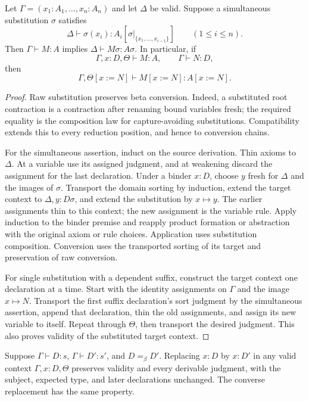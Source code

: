 \begin{lemma}\label{pts:substitution}
Let $\Gamma=(x_1:A_1,\ldots,x_n:A_n)$ and let $\Delta$ be valid.
Suppose a simultaneous substitution $\sigma$ satisfies
\[
 \Delta\vdash\sigma(x_i):A_i[\sigma|_{\{x_1,\ldots,x_{i-1}\}}]
 \qquad(1\leq i\leq n).
\]
Then $\Gamma\vdash M:A$ implies $\Delta\vdash M\sigma:A\sigma$.
In particular, if
\[
 \Gamma,x:D,\Theta\vdash M:A,
 \qquad \Gamma\vdash N:D,
\]
then
\[
 \Gamma,\Theta[x:=N]\vdash M[x:=N]:A[x:=N].
\]
\end{lemma}

\begin{proof}
Raw substitution preserves beta conversion. Indeed, a substituted root
contraction is a contraction after renaming bound variables fresh;
the required equality is the composition law for capture-avoiding
substitutions. Compatibility extends this to every reduction position,
and hence to conversion chains.

For the simultaneous assertion, induct on the source derivation.
Thin axioms to $\Delta$. At a variable use its assigned judgment, and
at weakening discard the assignment for the last declaration. Under a
binder $x:D$, choose $y$ fresh for $\Delta$ and the images of $\sigma$.
Transport the domain sorting by induction, extend the target context
to $\Delta,y:D\sigma$, and extend the substitution by $x\mapsto y$.
The earlier assignments thin to this context; the new assignment is
the variable rule. Apply induction to the binder premise and reapply
product formation or abstraction with the original axiom or rule
choices. Application uses substitution composition. Conversion uses
the transported sorting of its target and preservation of raw
conversion.

For single substitution with a dependent suffix, construct the target
context one declaration at a time. Start with the identity assignments
on $\Gamma$ and the image $x\mapsto N$. Transport the first suffix
declaration's sort judgment by the simultaneous assertion, append that
declaration, thin the old assignments, and assign its new variable to
itself. Repeat through $\Theta$, then transport the desired judgment.
This also proves validity of the substituted target context.
\end{proof}

\begin{lemma}\label{pts:context-conversion}
Suppose $\Gamma\vdash D:s$, $\Gamma\vdash D':s'$, and $D=_\beta D'$.
Replacing $x:D$ by $x:D'$ in any valid context
$\Gamma,x:D,\Theta$ preserves validity and every derivable judgment,
with the subject, expected type, and later declarations unchanged.
The converse replacement has the same property.
\end{lemma}


